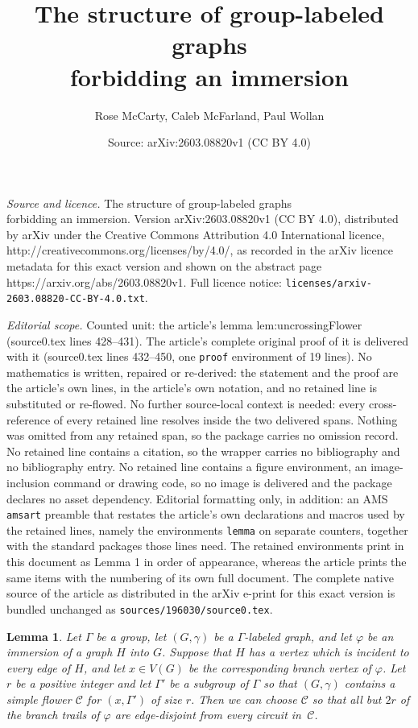 \documentclass[10pt,a4paper]{amsart}
\title{The structure of group-labeled graphs\\ forbidding an immersion}
\author{Rose McCarty, Caleb McFarland, Paul Wollan}
\date{Source: arXiv:2603.08820v1 (CC BY 4.0)}
\newtheorem{lemma}{Lemma}
\newcommand{\C}{\mathcal{C}}
\begin{document}
\maketitle

\noindent\emph{Source and licence.} The structure of group-labeled graphs\\ forbidding an immersion. Version arXiv:2603.08820v1 (CC BY 4.0), distributed by arXiv under the Creative Commons Attribution 4.0 International licence, http://creativecommons.org/licenses/by/4.0/, as recorded in the arXiv licence metadata for this exact version and shown on the abstract page https://arxiv.org/abs/2603.08820v1. Full licence notice: \texttt{licenses/arxiv-2603.08820-CC-BY-4.0.txt}.\par\smallskip

\noindent\textit{Editorial scope.} Counted unit: the article's lemma lem:uncrossingFlower (source0.tex lines 428--431). The article's complete original proof of it is delivered with it (source0.tex lines 432--450, one \texttt{proof} environment of 19 lines). No mathematics is written, repaired or re-derived: the statement and the proof are the article's own lines, in the article's own notation, and no retained line is substituted or re-flowed.  No further source-local context is needed: every cross-reference of every retained line resolves inside the two delivered spans.  Nothing was omitted from any retained span, so the package carries no omission record.  No retained line contains a citation, so the wrapper carries no bibliography and no bibliography entry.  No retained line contains a figure environment, an image-inclusion command or drawing code, so no image is delivered and the package declares no asset dependency.  Editorial formatting only, in addition: an AMS \texttt{amsart} preamble that restates the article's own declarations and macros used by the retained lines, namely the environments \texttt{lemma} on separate counters, together with the standard packages those lines need.  The retained environments print in this document as Lemma 1 in order of appearance, whereas the article prints the same items with the numbering of its own full document.  The complete native source of the article as distributed in the arXiv e-print for this exact version is bundled unchanged as \texttt{sources/196030/source0.tex}.
\begin{lemma}
\label{lem:uncrossingFlower}
    Let $\Gamma$ be a group, let $(G, \gamma)$ be a $\Gamma$-labeled graph, and let $\varphi$ be an immersion of a graph $H$ into $G$. Suppose that $H$ has a vertex which is incident to every edge of $H$, and let $x \in V(G)$ be the corresponding branch vertex of $\varphi$. Let $r$ be a positive integer and let $\Gamma'$ be a subgroup of $\Gamma$ so that $(G, \gamma)$ contains a simple flower $\C$ for $(x, \Gamma')$ of size $r$. Then we can choose $\C$ so that all but $2r$ of the branch trails of $\varphi$ are edge-disjoint from every circuit in~$\C$.
\end{lemma}
\end{document}
